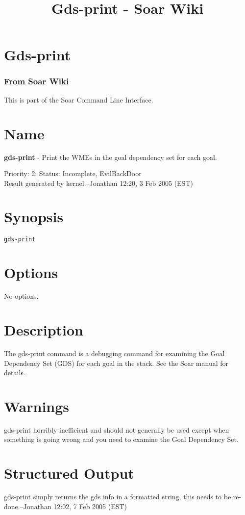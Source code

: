 \documentclass[10pt]{article}
\title{Gds-print - Soar Wiki}
\begin{document}
\section*{Gds-print}
\subsubsection*{From Soar Wiki}


 This is part of the Soar Command Line Interface. 
\section*{ Name }


 \textbf{gds-print}
 - Print the WMEs in the goal dependency set for each goal. 


 Priority: 2; Status: Incomplete, EvilBackDoor\\ 
Result generated by kernel.--Jonathan 12:20, 3 Feb 2005 (EST) 
\section*{ Synopsis }
\begin{verbatim}
gds-print

\end{verbatim}
\section*{ Options }


 No options. 
\section*{ Description }


 The gds-print command is a debugging command for examining the Goal Dependency Set (GDS) for each goal in the stack. See the Soar manual for details. 
\section*{ Warnings }


 gds-print horribly inefficient and should not generally be used except when something is going wrong and you need to examine the Goal Dependency Set. 
\section*{ Structured Output }


 gds-print simply returns the gds info in a formatted string, this needs to be re-done.--Jonathan 12:02, 7 Feb 2005 (EST) 
\end{document}

